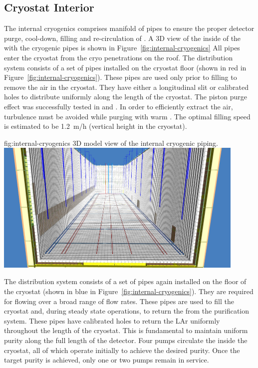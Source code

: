 
\subsection{Cryostat Interior}
The internal cryogenics comprises manifold of pipes to ensure the proper detector purge, cool-down, filling and re-circulation of .
A 3D view of the inside of the  with the cryogenic pipes is shown in Figure~\ref{fig:internal-cryogenics}
All pipes enter the cryostat from the cryo penetrations on the roof.
The  distribution system consists of a set of pipes installed on the cryostat floor (shown in red in Figure~\ref{fig:internal-cryogenics}).
These pipes are used only prior to filling to remove the air in the cryostat.
They have either a longitudinal slit or calibrated holes to distribute  uniformly along the length of the cryostat.
The piston purge effect was successfully tested in  and  .
In order to efficiently extract the air, turbulence must be avoided while purging with warm .
The optimal filling speed is estimated to be 1.2~m/h (vertical height in the cryostat).
\begin{dunefigure}{fig:internal-cryogenics}
{3D model view of the internal cryogenic piping.}
\includegraphics[width=0.9\textwidth]{graphics/internal-cryogenics.png}
\end{dunefigure}

The  distribution system consists of a set of pipes again installed on the floor of the cryostat (shown in blue in Figure~\ref{fig:internal-cryogenics}).
They are required for flowing  over a broad range of flow rates.
These pipes are used to fill the cryostat and, during steady state operations, to return the  from the purification system.
These pipes have calibrated holes to return the LAr uniformly throughout the length of the cryostat.
This is fundamental to maintain uniform purity along the full length of the detector.
Four pumps circulate the  inside the cryostat, all of which operate initially to achieve the desired purity.
Once the target purity is achieved, only one or two pumps remain in service.

